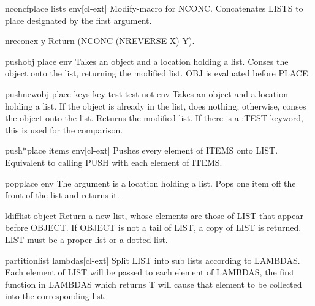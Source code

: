\documentclass[10pt,english]{book}
\begin{document}
\begin{macro}{nconcf}{place \rest lists \env env}[cl-ext]
  Modify-macro for NCONC. Concatenates LISTS to place designated by the first
argument.
\end{macro}

\begin{function}{nreconc}{x y}
  Return (NCONC (NREVERSE X) Y).
\end{function}

\begin{macro}{push}{obj place \env env}
  Takes an object and a location holding a list. Conses the object onto
  the list, returning the modified list. OBJ is evaluated before PLACE.
\end{macro}

\begin{macro}{pushnew}{obj place \rest keys \key key test test-not \env env}
  Takes an object and a location holding a list. If the object is
  already in the list, does nothing; otherwise, conses the object onto
  the list. Returns the modified list. If there is a :TEST keyword, this
  is used for the comparison.
\end{macro}

\begin{macro}{push*}{place \rest items \env env}[cl-ext]
  Pushes every element of ITEMS onto LIST. Equivalent to calling PUSH
  with each element of ITEMS.
\end{macro}

\begin{macro}{pop}{place \env env}
  The argument is a location holding a list. Pops one item off the front
  of the list and returns it.
\end{macro}

\begin{function}{ldiff}{list object}
  Return a new list, whose elements are those of LIST that appear before
   OBJECT. If OBJECT is not a tail of LIST, a copy of LIST is returned.
   LIST must be a proper list or a dotted list.
\end{function}

\begin{function}{partition}{list \rest lambdas}[cl-ext]
  Split LIST into sub lists according to LAMBDAS. Each element of LIST
  will be passed to each element of LAMBDAS, the first function in
  LAMBDAS which returns T will cause that element to be collected into
  the corresponding list.
\end{function}
\end{document}
